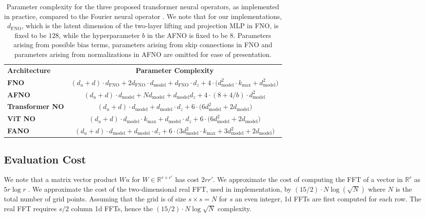 \documentclass[twoside]{article}
\newcommand{\1}{\mathbbm{1}}
\newcommand{\R}{\mathbbm{R}}
\providecommand{\mathbbm}{\mathbb} %
\begin{document}
\begin{table}[htbp]
    \centering
    \begin{tabular}{|l|c|}
        \hline
        \cellcolor{gray!30}\textbf{Architecture} & \cellcolor{gray!30}\textbf{Parameter Complexity}  \\
        \hhline{|==|}
        \textbf{FNO} & $(d_u+d)\cdot d_{\textrm{FNO}}+2d_{\textrm{FNO}}\cdot  d_{\textrm{model}}+d_{\textrm{FNO}}\cdot d_z +4\cdot\bigl(d^2_{\textrm{model}}\cdot k_{\textrm{max}}+d_{\textrm{model}}^2 \bigr)$\\
        \hline
        \textbf{AFNO} & $(d_u+d)\cdot d_{\textrm{model}}+Nd_{\textrm{model}}+d_{\textrm{model}}d_z+4\cdot(8+4/b)\cdot d^2_{\textrm{model}}$\\
        \hline
        \textbf{Transformer NO}&  $(d_u+d)\cdot d_{\textrm{model}}+d_{\textrm{model}}\cdot d_z +6\cdot\bigl(6d^2_{\textrm{model}}+2d_{\textrm{model}} \bigr)$\\
        \hline
        \textbf{ViT NO}& $(d_u+d)\cdot d_{\textrm{model}}\cdot k_{\textrm{max}} + d_{\textrm{model}}\cdot d_z + 6\cdot\bigl( 6d^2_{\textrm{model}}+2d_{\textrm{model}}\bigr)$ \\
        \hline
        \textbf{FANO}& $(d_u+d)\cdot d_{\textrm{model}}+d_{\textrm{model}}\cdot d_z + 6\cdot \bigl(  3d^2_{\textrm{model}}\cdot k_{\textrm{max}}+ 3d^2_{\textrm{model}}+2d_{\textrm{model}}\bigr)$ \\
        \hline
    \end{tabular}
    \caption{Parameter complexity for the three proposed transformer neural operators, as implemented in practice, compared to the Fourier neural operator \citep{li2021fourier}. We note that for our implementations, $d_{\textrm{FNO}}$, which is the latent dimension of the two-layer lifting and projection MLP in FNO, is fixed to be $128$, while the hyperparameter $b$ in the AFNO is fixed to be $8$. Parameters arising from possible bias terms, parameters arising from skip connections in FNO and parameters arising from normalizations in AFNO are omitted for ease of presentation.}
    \label{tab:parameter_complexity1}
\end{table}


\subsection{Evaluation Cost}
\label{subsec:cost_complex}

We note that a matrix vector product $Wu$ for $W\in \R^{r\times r'}$ has cost $2rr'$. We approximate the cost of computing the FFT of a vector in $\R^r$ as $5r\log r$ \citep{hoop2022cost}. We approximate the cost of the two-dimensional real FFT, used in implementation, by $(15/2)\cdot N \log (\sqrt{N})$ where $N$ is the total number of grid points. Assuming that the grid is of size $s\times s=N$ for $s$ an even integer, 1d FFTs are first computed for each row. The real FFT requires $s/2$ column 1d FFTs, hence the $(15/2) \cdot  N \log \sqrt{N}$ complexity.
\end{document}
